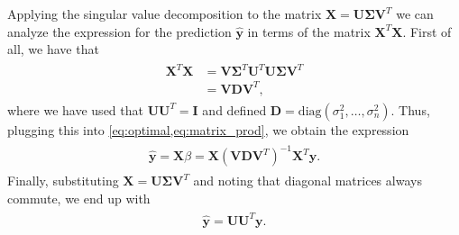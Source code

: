 \documentclass[dvipsnames, article, a4paper, oneside, 12pt]{memoir}
\newcommand{\X}{\bm{X}}
\newcommand{\diag}[1]{\mathrm{diag}(#1)}
\newcommand{\mat}[1]{\bm{#1}}
\newcommand{\y}{\bm{y}}
\begin{document}
  Applying the singular value decomposition to the matrix \(\X = \mat{U}
  \mat{\Sigma} \mat{V}^T\) we can analyze the expression for the prediction \( \hat{\y} \)
  in terms of the matrix \( \X^T \X \).  First of all, we have that
  \begin{align}
    \begin{split}
    \X^T \X &= \mat{V}\mat{\Sigma}^T\mat{U}^T\mat{U}\mat{\Sigma} \mat{V}^T\\
            &= \mat{V}\mat{D}\mat{V}^T, 
    \end{split}
  \end{align}
  where we have used that \( \mat{U}\mat{U}^T = \mat{I} \) and defined \(
  \mat{D} = \diag{\sigma_1^2, \ldots, \sigma_n^2} \).  Thus, plugging this into
  \cref{eq:optimal,eq:matrix_prod}, we obtain the expression
  \begin{align}
    \begin{split}
      \hat{\y} = \X \beta = \X (\mat{V}\mat{D}\mat{V}^T)^{-1} \mat{X}^T \y.
    \end{split}
  \end{align}
  Finally, substituting \( \X = \mat{U}\mat{\Sigma}\mat{V}^T \) and noting that
  diagonal matrices always commute, we end up with
  \begin{align}
    \begin{split}
      \hat{\y} = \mat{U}\mat{U}^T \mat{y}.
    \end{split}
  \end{align}
\end{document}
